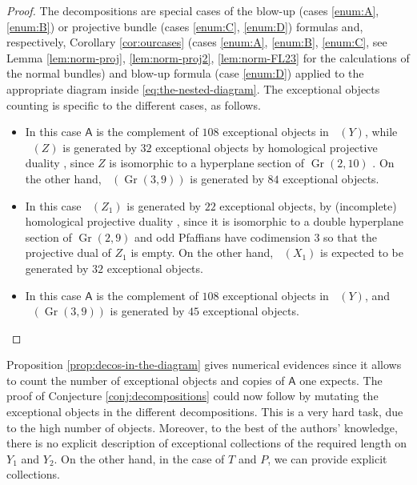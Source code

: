\documentclass[11pt]{article}
\theoremstyle{plain}
\theoremstyle{definition}
\newcommand{\cat}[1]{\mathsf{#1}}
\DeclareMathOperator{\Db}{{\cat{D}^{\mathrm{b}}}}
\DeclareMathOperator{\Gr}{Gr}
\begin{document}
\begin{proof}
The decompositions are special cases of the blow-up (cases \eqref{enum:A}, \eqref{enum:B}) or projective bundle (cases \eqref{enum:C}, \eqref{enum:D}) formulas and, respectively,
Corollary \ref{cor:ourcases} (cases \eqref{enum:A}, \eqref{enum:B}, \eqref{enum:C}, see Lemma \ref{lem:norm-proj}, \ref{lem:norm-proj2}, \ref{lem:norm-FL23} for the calculations
of the normal bundles) and blow-up formula (case \eqref{enum:D}) applied to the appropriate diagram inside
\eqref{eq:the-nested-diagram}.
The exceptional objects counting is specific to the different cases, as follows.

\begin{itemize}

\item[\eqref{enum:A}] In this case $\cat{A}$ is the complement of $108$ exceptional objects
in $\Db(Y)$, while $\Db(Z)$ is generated by $32$ exceptional objects by homological projective
duality \cite[Th.\,4.33]{rennemo-segal}, since $Z$ is isomorphic to a hyperplane
section of $\Gr(2,10)$ . On the other hand, $\Db(\Gr(3,9))$ is generated
by $84$ exceptional objects.

\item[\eqref{enum:B}] In this case $\Db(Z_1)$ is generated by $22$ exceptional objects,
by (incomplete) homological projective duality \cite[Th.\,4.33]{rennemo-segal},
since it is isomorphic to a double hyperplane
section of $\Gr(2,9)$ and odd Pfaffians have codimension
3 so that the projective dual of $Z_1$ is empty. On the other hand, $\Db(X_1)$ is
expected to be generated by $32$ exceptional objects.

\item[\eqref{enum:C}] In this case $\cat{A}$ is the complement of $108$ exceptional objects
in $\Db(Y)$, and $\Db(\Gr(3,9))$ is generated
by $45$ exceptional objects.\qedhere
\end{itemize}
\end{proof}

Proposition \ref{prop:decos-in-the-diagram} gives numerical evidences since it allows to count the
number of exceptional objects and copies of $\cat{A}$ one expects. The proof of Conjecture
\ref{conj:decompositions} could now follow by mutating the exceptional objects in the different decompositions.
This is a very hard task, due to the high number of objects. Moreover, to the best of
the authors' knowledge,
there is no explicit description of exceptional collections of the required length on $Y_1$ and $Y_2$.
On the other hand, in the case of $T$ and $P$, we can provide explicit collections.
\end{document}
